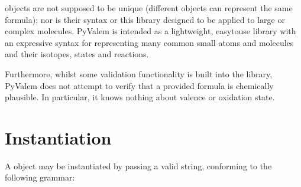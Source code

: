 \documentclass[letterpaper,10pt,english]{sphinxmanual}
\begin{document}
 objects are not supposed to be unique (different  objects can represent the same formula); nor is their syntax or this library designed to be applied to large or complex molecules. PyValem is intended as a lightweight, easy\sphinxhyphen{}to\sphinxhyphen{}use library with an expressive syntax for representing many common small atoms and molecules and their isotopes, states and reactions.

Furthermore, whilst some validation functionality is built into the library, PyValem does not attempt to verify that a provided formula is chemically plausible. In particular, it knows nothing about valence or oxidation state.


\section{Instantiation}
\label{\detokenize{formula:instantiation}}
A  object may be instantiated by passing a valid string, conforming to the following grammar:
\end{document}
